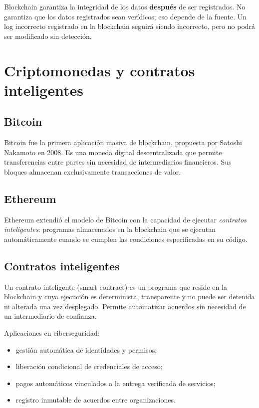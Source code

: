 \documentclass[
  coursetitle={Cómputo Nube y Tecnologías Emergentes},
  coursehours={96},
  coursedate={Verano 2026},
  doctype={Notas de clase},
  otherlangs={english,french},
  authorname={Lázaro},
  authorsurname={Bustio-Martínez},
  authortitle={PhD},
  role={Profesor Investigador},
  email={lbustio@inaoe.mx},
  phone={5559504000},
  ext={7459},
  institution={Instituto Nacional de Astrofísica, Óptica y Electrónica (INAOE)},
  department={Maestría en Ciencias en Tecnologías de Seguridad},
  address={Luis Enrique Erro 1, Sta. Ma. Tonantzintla, San Andrés Cholula, CP 72840, Puebla, México},
  margin={0.5in}
]{../../lbustio_lecture_notes}
\begin{document}
\begin{tcolorbox}[title=Limitación importante]
Blockchain garantiza la integridad de los datos \textbf{después} de ser registrados. No garantiza que los datos registrados sean verídicos; eso depende de la fuente. Un log incorrecto registrado en la blockchain seguirá siendo incorrecto, pero no podrá ser modificado sin detección.
\end{tcolorbox}

\section{Criptomonedas y contratos inteligentes}

\subsection{Bitcoin}

Bitcoin fue la primera aplicación masiva de blockchain, propuesta por Satoshi Nakamoto en 2008. Es una moneda digital descentralizada que permite transferencias entre partes sin necesidad de intermediarios financieros. Sus bloques almacenan exclusivamente transacciones de valor.

\subsection{Ethereum}

Ethereum extendió el modelo de Bitcoin con la capacidad de ejecutar \textit{contratos inteligentes}: programas almacenados en la blockchain que se ejecutan automáticamente cuando se cumplen las condiciones especificadas en su código.

\subsection{Contratos inteligentes}

Un contrato inteligente (smart contract) es un programa que reside en la blockchain y cuya ejecución es determinista, transparente y no puede ser detenida ni alterada una vez desplegado. Permite automatizar acuerdos sin necesidad de un intermediario de confianza.

Aplicaciones en ciberseguridad:
\begin{itemize}
  \item gestión automática de identidades y permisos;
  \item liberación condicional de credenciales de acceso;
  \item pagos automáticos vinculados a la entrega verificada de servicios;
  \item registro inmutable de acuerdos entre organizaciones.
\end{itemize}
\end{document}
